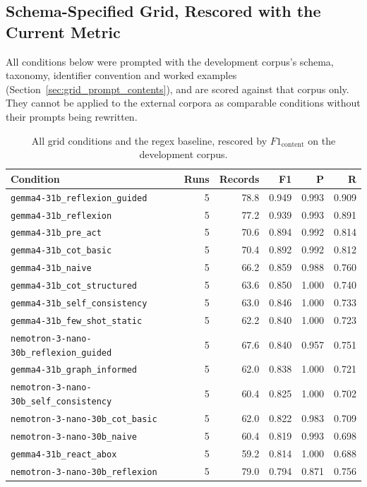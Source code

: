 \documentclass[11pt]{article}
\begin{document}
\subsection*{Schema-Specified Grid, Rescored with the Current Metric}
All conditions below were prompted with the development corpus's schema,
taxonomy, identifier convention and worked examples
(Section~\ref{sec:grid_prompt_contents}), and are scored against that corpus only.
They cannot be applied to the external corpora as comparable conditions without
their prompts being rewritten.
\begin{table}[H]\centering
\caption{All grid conditions and the regex baseline, rescored by $F1_{\text{content}}$ on the development corpus.}
\label{tab:app_grid}
\small\begin{tabular}{@{}lrrrrr@{}}\toprule
\textbf{Condition} & \textbf{Runs} & \textbf{Records} & \textbf{F1} & \textbf{P} & \textbf{R} \\ \midrule
\texttt{gemma4-31b\_reflexion\_guided} & 5 & 78.8 & 0.949 & 0.993 & 0.909 \\
\texttt{gemma4-31b\_reflexion} & 5 & 77.2 & 0.939 & 0.993 & 0.891 \\
\texttt{gemma4-31b\_pre\_act} & 5 & 70.6 & 0.894 & 0.992 & 0.814 \\
\texttt{gemma4-31b\_cot\_basic} & 5 & 70.4 & 0.892 & 0.992 & 0.812 \\
\texttt{gemma4-31b\_naive} & 5 & 66.2 & 0.859 & 0.988 & 0.760 \\
\texttt{gemma4-31b\_cot\_structured} & 5 & 63.6 & 0.850 & 1.000 & 0.740 \\
\texttt{gemma4-31b\_self\_consistency} & 5 & 63.0 & 0.846 & 1.000 & 0.733 \\
\texttt{gemma4-31b\_few\_shot\_static} & 5 & 62.2 & 0.840 & 1.000 & 0.723 \\
\texttt{nemotron-3-nano-30b\_reflexion\_guided} & 5 & 67.6 & 0.840 & 0.957 & 0.751 \\
\texttt{gemma4-31b\_graph\_informed} & 5 & 62.0 & 0.838 & 1.000 & 0.721 \\
\texttt{nemotron-3-nano-30b\_self\_consistency} & 5 & 60.4 & 0.825 & 1.000 & 0.702 \\
\texttt{nemotron-3-nano-30b\_cot\_basic} & 5 & 62.0 & 0.822 & 0.983 & 0.709 \\
\texttt{nemotron-3-nano-30b\_naive} & 5 & 60.4 & 0.819 & 0.993 & 0.698 \\
\texttt{gemma4-31b\_react\_abox} & 5 & 59.2 & 0.814 & 1.000 & 0.688 \\
\texttt{nemotron-3-nano-30b\_reflexion} & 5 & 79.0 & 0.794 & 0.871 & 0.756 \\

\end{tabular}
\end{table}
\end{document}
